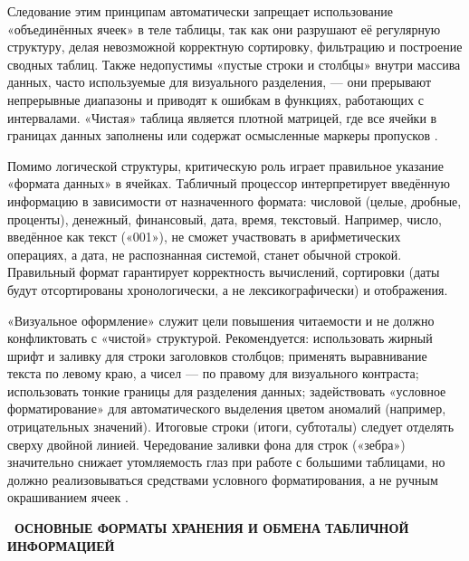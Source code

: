 \documentclass{SibFU-docs}
\begin{document}
Следование этим принципам автоматически запрещает использование «объединённых ячеек» в теле таблицы, так как они разрушают её регулярную структуру, делая невозможной корректную сортировку, фильтрацию и построение сводных таблиц. Также недопустимы «пустые строки и столбцы» внутри массива данных, часто используемые для визуального разделения, --- они прерывают непрерывные диапазоны и приводят к ошибкам в функциях, работающих с интервалами. «Чистая» таблица является плотной матрицей, где все ячейки в границах данных заполнены или содержат осмысленные маркеры пропусков \cite{lachermarcus_oerspreadsheets_2025}.


Помимо логической структуры, критическую роль играет правильное указание «формата данных» в ячейках. Табличный процессор интерпретирует введённую информацию в зависимости от назначенного формата: числовой (целые, дробные, проценты), денежный, финансовый, дата, время, текстовый. Например, число, введённое как текст («001»), не сможет участвовать в арифметических операциях, а дата, не распознанная системой, станет обычной строкой. Правильный формат гарантирует корректность вычислений, сортировки (даты будут отсортированы хронологически, а не лексикографически) и отображения.

«Визуальное оформление» служит цели повышения читаемости и не должно конфликтовать с «чистой» структурой. Рекомендуется: использовать жирный шрифт и заливку для строки заголовков столбцов; применять выравнивание текста по левому краю, а чисел --- по правому для визуального контраста; использовать тонкие границы для разделения данных; задействовать «условное форматирование» для автоматического выделения цветом аномалий (например, отрицательных значений). Итоговые строки (итоги, субтоталы) следует отделять сверху двойной линией. Чередование заливки фона для строк («зебра») значительно снижает утомляемость глаз при работе с большими таблицами, но должно реализовываться средствами условного форматирования, а не ручным окрашиванием ячеек \cite{gormley_data_organization_2018}.

\newpage
{}
\begin{center}\textbf{\thesection\ ОСНОВНЫЕ ФОРМАТЫ ХРАНЕНИЯ И ОБМЕНА ТАБЛИЧНОЙ ИНФОРМАЦИЕЙ}\end{center}
\vspace*{-1.5em}
\end{document}
